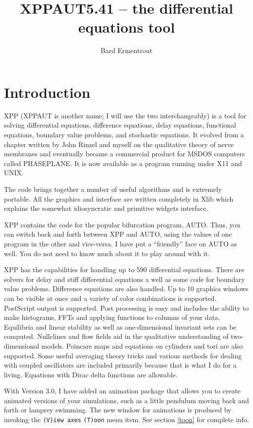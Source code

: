 \documentclass{article}
\title{XPPAUT5.41 -- the differential equations tool}
\author{Bard Ermentrout}
\begin{document}
\maketitle
\tableofcontents
\newpage
\section{Introduction} XPP (XPPAUT is another name; I will use the two
interchangeably)
  is a tool for solving differential
equations,
 difference
equations, delay equations, functional equations, boundary value
problems, and stochastic equations.
 It evolved
from a chapter written by John Rinzel and myself on the qualitative
 theory of nerve membranes and eventually became a commercial product
 for MSDOS computers called PHASEPLANE.  It is now available as a
program running
 under
 X11 and UNIX.

 The code
brings together a number of useful algorithms and is extremely portable.
 All the graphics and interface are written completely in Xlib which explains
the somewhat idiosyncratic and primitive widgets interface.

XPP contains the code for the popular bifurcation
program, AUTO.  Thus, you can switch back and forth between XPP and
AUTO, using the values of one program in the other and vice-versa.  I
have put a ``friendly'' face on AUTO as well.  You do not need to know
much about it to play around with it.

XPP has the capabilities for handling up to 590 differential equations.
 There are solvers for delay and stiff differential equations a well as
 some code for boundary value problems.  Difference equations are also
 handled.  Up to 10 graphics windows can be visible at once and a variety
 of color combinations is supported.  PostScript output
 is supported.  Post processing is easy and includes the ability to make
 histograms, FFTs and applying functions to columns of your data.
Equilibria
 and linear stability as well as one-dimensional invariant sets can be
 computed.  Nullclines and flow fields aid in the qualitative understanding
 of two-dimensional models.  Poincare maps and equations on cylinders and
 tori are also supported.  Some useful averaging theory tricks and various
 methods for dealing with coupled oscillators are included primarily because
 that is what I do for a living. Equations with Dirac delta functions
are allowable.

With Version 3.0, I have added an animation package that allows you to
create animated versions of your simulations, such as a little
pendulum moving back and forth or lamprey swimming. The new window for
animations is produced by invoking the {\tt (V)iew axes} {\tt (T)oon}
menu item.  See section \ref{toon} for complete info.
\end{document}
